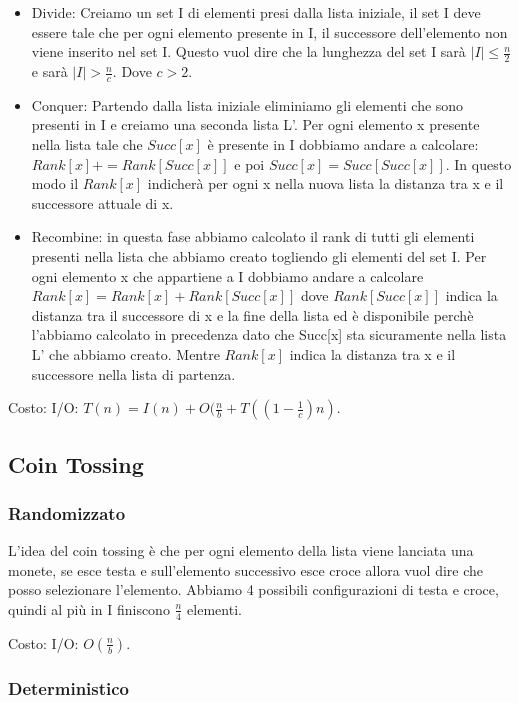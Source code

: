 \documentclass[12pt]{article}
\begin{document}
\begin{itemize}
    \item Divide: Creiamo un set I di elementi presi dalla lista iniziale, il set I deve essere tale che per ogni elemento presente in I, il successore dell'elemento non viene inserito nel set I. Questo vuol dire che la lunghezza del set I sarà $|I| \leq \frac{n}{2}$ e sarà $|I| > \frac{n}{c}$. Dove $c>2$.
    \item Conquer: Partendo dalla lista iniziale eliminiamo gli elementi che sono presenti in I e creiamo una seconda lista L'. Per ogni elemento x presente nella lista tale che $Succ[x]$ è presente in I dobbiamo andare a calcolare: $Rank[x] += Rank[Succ[x]]$ e poi $Succ[x] = Succ[Succ[x]]$. In questo modo il $Rank[x]$ indicherà per ogni x nella nuova lista la distanza tra x e il successore attuale di x.
    \item Recombine: in questa fase abbiamo calcolato il rank di tutti gli elementi presenti nella lista che abbiamo creato togliendo gli elementi del set I. Per ogni elemento x che appartiene a I dobbiamo andare a calcolare $Rank[x] = Rank[x] + Rank[Succ[x]]$ dove $ Rank[Succ[x]]$ indica la distanza tra il successore di x e la fine della lista ed è disponibile perchè l'abbiamo calcolato in precedenza dato che Succ[x] sta sicuramente nella lista L' che abbiamo creato.
    Mentre $Rank[x]$ indica la distanza tra x e il successore nella lista di partenza.
\end{itemize}

Costo: I/O: $T(n) = I(n) + O(\frac{n}{b} + T((1-\frac{1}{c})n)$.


\subsection{Coin Tossing}

\subsubsection{Randomizzato}

L'idea del coin tossing è che per ogni elemento della lista viene lanciata una monete, se esce testa e sull'elemento successivo esce croce allora vuol dire che posso selezionare l'elemento. Abbiamo 4 possibili configurazioni di testa e croce, quindi al più in I finiscono $\frac{n}{4}$ elementi.

Costo: I/O: $O(\frac{n}{b})$.

\subsubsection{Deterministico}
\end{document}
